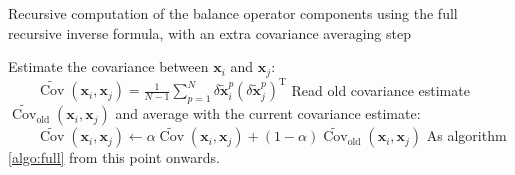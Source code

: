 \documentclass[12pt]{scrartcl}
\DeclareMathOperator{\Cov}{Cov}
\begin{document}
\begin{algorithm}[!ht]
\caption{Recursive computation of the balance operator components using the full recursive inverse formula, with an extra covariance averaging step \label{algo:full_averaged}}
\begin{algorithmic}
\STATE Estimate the covariance between $\mathbf{x}_i$ and $\mathbf{x}_j$:
\STATE $\displaystyle \qquad \widetilde{\Cov}\left(\mathbf{x}_i, \mathbf{x}_j\right) = \frac{1}{N-1} \sum_{p=1}^N \delta \widetilde{\mathbf{x}}^p_i \left(\delta \widetilde{\mathbf{x}}^p_j\right)^\mathrm{T}$
\STATE Read old covariance estimate $\widetilde{\Cov}_\textrm{old}\left(\mathbf{x}_i, \mathbf{x}_j\right)$ and average with the current covariance estimate:
\STATE $\displaystyle \qquad \widetilde{\Cov}\left(\mathbf{x}_i, \mathbf{x}_j\right) \leftarrow \alpha \widetilde{\Cov}\left(\mathbf{x}_i, \mathbf{x}_j\right) + (1-\alpha) \widetilde{\Cov}_\textrm{old}\left(\mathbf{x}_i, \mathbf{x}_j\right)$
\ENDFOR
\ENDFOR
\STATE As algorithm \ref{algo:full} from this point onwards.
\end{algorithmic}
\end{algorithm}
\end{document}
